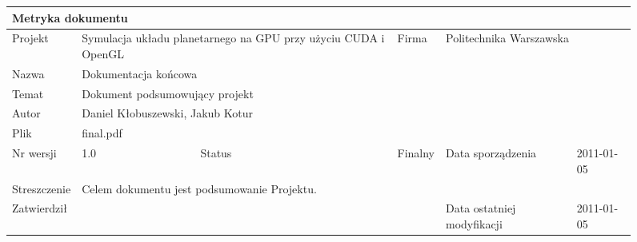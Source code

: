 \begin{figure}[h]
	\centering
\begin{tabular}{|p{}|p{}|p{}|p{}|p{}|p{}|p{}|}
	\hline
	\multicolumn{7}{|l|}{Metryka dokumentu} \\
	\hline
	Projekt & \multicolumn{2}{p{.34\textwidth}|}{Symulacja układu planetarnego na GPU przy użyciu CUDA i OpenGL} &
	Firma & \multicolumn{3}{l|}{Politechnika Warszawska} \\
	\hline
	Nazwa & \multicolumn{6}{l|}{Dokumentacja końcowa} \\
	\hline
	Temat & \multicolumn{6}{l|}{Dokument podsumowujący projekt} \\
	\hline
	Autor & \multicolumn{6}{l|}{Daniel Kłobuszewski, Jakub Kotur} \\
	\hline
	Plik & \multicolumn{6}{l|}{final.pdf} \\
	\hline
	Nr wersji & 1.0 & Status & Finalny & \multicolumn{2}{l|}{Data sporządzenia} & 2011-01-05 \\
	\hline
	Streszczenie & \multicolumn{6}{p{11cm}|}{Celem dokumentu jest podsumowanie Projektu.} \\
	\hline
	Zatwierdził & \multicolumn{3}{l|}{ } &
	\multicolumn{2}{l|}{Data ostatniej modyfikacji} & 2011-01-05 \\
	\hline
\end{tabular}

	\label{tab:metric}
\end{figure}

